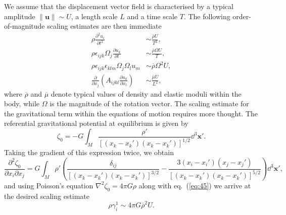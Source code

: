 We assume that the displacement vector field is 
characterised by a typical amplitude $\|\mathbf{u}\|\sim U$, a length scale $L$ and a time scale $T$. The following 
order-of-magnitude scaling estimates are then immediate
\begin{align}
\rho\frac{\partial^{2}u_{i}}{\partial t^{2}}&\sim\frac{\overline{\rho}U}{T^{2}}, \label{eq:47} \\
\rho\epsilon_{ijk}\Omega_{j}\frac{\partial u_{k}}{\partial t}&\sim\frac{\overline{\rho}\Omega U}{T}, \label{eq:48} \\
\rho\epsilon_{ijk}\epsilon_{klm}\Omega_{j}\Omega_{l}u_{m}&\sim\overline{\rho}\Omega^{2}U, \label{eq:49} \\
\frac{\partial}{\partial x_{j}}\left(A_{ijkl}\frac{\partial u_{k}}{\partial x_{l}}\right)&\sim\frac{\overline{\mu}U}{L^{2}}, \label{eq:50}
\end{align}
where $\overline{\rho}$ and $\overline{\mu}$ denote typical values of density and elastic moduli within the body, 
while $\Omega$ is the magnitude of the rotation vector. The scaling estimate for the gravitational term within 
the equations of motion requires more thought. The referential gravitational potential at equilibrium is given by
\begin{equation}
\zeta_{0}=-G\int_{M}\frac{\rho'}{[(x_{k}-x_{k}')(x_{k}-x_{k}')]^{1/2}}\dd^{3}\mathbf{x}'.
\label{eq:51}
\end{equation}
Taking the gradient of this expression twice, we obtain
\begin{equation}
\frac{\partial^{2}\zeta_{0}}{\partial x_{i}\partial x_{j}}=G\int_{M}\rho'\left(\frac{\delta_{ij}}{[(x_{k}-x_{k}')
(x_{k}-x_{k}')]^{3/2}}-\frac{3(x_{i}-x_{i}')(x_{j}-x_{j}')}{[(x_{k}-x_{k}')(x_{k}-x_{k}')]^{5/2}}\right)\dd^{3}\mathbf{x}',
\label{eq:52}
\end{equation}
and using Poisson's equation $\nabla^{2}\zeta_{0}=4\pi G\rho$ along with eq.~(\ref{eq:45}) we arrive at the desired scaling estimate
\begin{equation}
\rho\gamma_{i}^{1}\sim4\pi G\overline{\rho}^{2}U.
\label{eq:53}
\end{equation}

